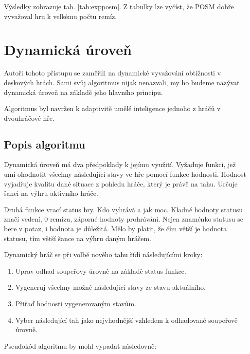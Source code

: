 Výsledky zobrazuje tab. \ref{tab:expposm}. Z tabulky lze vyčíst, že POSM dobře vyvažoval hru k velkému počtu remíz.

\section{Dynamická úroveň} \label{sec-dynlevel}

Autoři tohoto přístupu se zaměřili na dynamické vyvažování obtížnosti v deskových hrách. \cite{24DynLev} Sami svůj algoritmus nijak nenazvali, my ho budeme nazývat dynamická úroveň na základě jeho hlavního principu.

Algoritmus byl navržen k adaptivitě umělé inteligence jednoho z hráčů v dvouhráčové hře.

\subsection{Popis algoritmu}

Dynamická úroveň má dva předpoklady k jejímu využití. Vyžaduje funkci, jež umí ohodnotit všechny následující stavy ve hře pomocí funkce hodnosti. Hodnost vyjadřuje kvalitu dané situace z pohledu hráče, který je právě na tahu. Určuje šanci na výhru aktivního hráče.

Druhá funkce vrací status hry. Kdo vyhrává a jak moc. Kladné hodnoty statusu značí vedení, 0 remízu, záporné hodnoty prohrávání. Nejen znaménko statusu se bere v potaz, i hodnota je důležitá. Mělo by platit, že čím větší je hodnota statusu, tím větší šance na výhru daným hráčem.

Dynamický hráč se při volbě nového tahu řídí následujícími kroky:

\begin{enumerate}
	\item Uprav odhad soupeřovy úrovně na základě status funkce.
	\item Vygeneruj všechny možné následující stavy ze stavu aktuálního.
	\item Přiřaď hodnosti vygenerovaným stavům.
	\item Vyber následující tah jako nejvhodnější vzhledem k odhadované soupeřově úrovně.
\end{enumerate}

Pseudokód algoritmu by mohl vypadat následovně:

